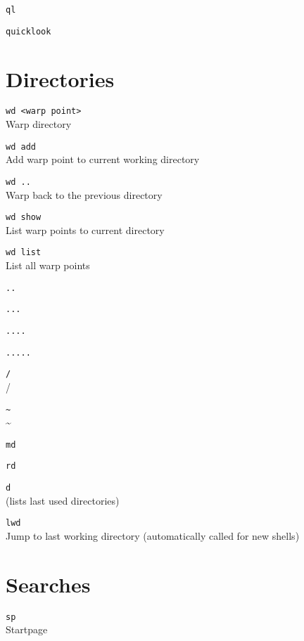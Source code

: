 \documentclass[a4paper,landscape,columns=3]{cheatsheet}
\begin{document}
\texttt{ql}\\
{}

\texttt{quicklook}\\
{}

\section{Directories}

\texttt{wd <warp point>}\\
Warp directory

\texttt{wd add}\\
Add warp point to current working directory

\texttt{wd ..}\\
Warp back to the previous directory

\texttt{wd show}\\
List warp points to current directory

\texttt{wd list}\\
List all warp points

\texttt{..}\\
{}

\texttt{...}\\
{}

\texttt{....}\\
{}

\texttt{.....}\\
{}

\texttt{/}\\
{} /

\texttt{\textasciitilde}\\
{} \textasciitilde

\texttt{md}\\
{}

\texttt{rd}\\
{}

\texttt{d}\\
{} (lists last used directories)

\texttt{lwd}\\
Jump to last working directory (automatically called for new shells)

\section{Searches}

\texttt{sp}\\
Startpage
\end{document}
